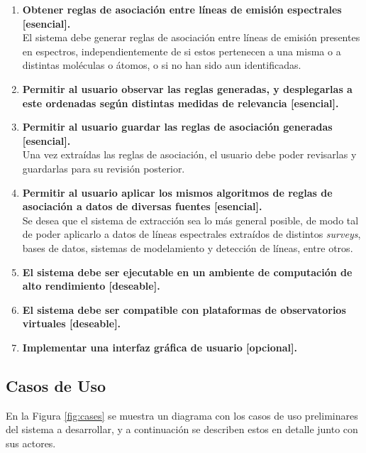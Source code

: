 \begin{enumerate}
	\item \textbf{Obtener reglas de asociación entre líneas de emisión espectrales [esencial].} \\
	El sistema debe generar reglas de asociación entre líneas de emisión presentes en espectros, independientemente de si estos pertenecen a una misma o a distintas moléculas o átomos, o si no han sido aun identificadas.
	\item \textbf{Permitir al usuario observar las reglas generadas, y desplegarlas a este ordenadas según distintas medidas de relevancia [esencial].} \\
	\item \textbf{Permitir al usuario guardar las reglas de asociación generadas [esencial].} \\
	Una vez extraídas las reglas de asociación, el usuario debe poder revisarlas y guardarlas para su revisión posterior.
	\item \textbf{Permitir al usuario aplicar los mismos algoritmos de reglas de asociación a datos de diversas fuentes [esencial].} \\
	Se desea que el sistema de extracción sea lo más general posible, de modo tal de poder aplicarlo a datos de líneas espectrales extraídos de distintos \textit{surveys}, bases de datos, sistemas de modelamiento y detección de líneas, entre otros.
	\item \textbf{El sistema debe ser ejecutable en un ambiente de computación de alto rendimiento [deseable].}
	\item \textbf{El sistema debe ser compatible con plataformas de observatorios virtuales [deseable].} 
	\item \textbf{Implementar una interfaz gráfica de usuario [opcional].}
\end{enumerate}

\subsection{Casos de Uso}

En la Figura \ref{fig:cases} se muestra un diagrama con los casos de uso preliminares del sistema a desarrollar, y a continuación se describen estos en detalle junto con sus actores.

